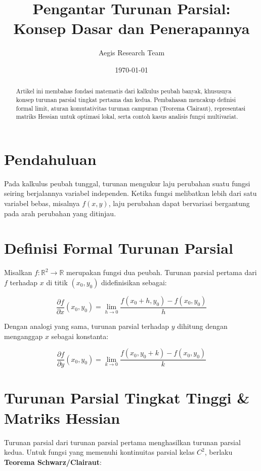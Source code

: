 \documentclass[11pt,a4paper]{article}
\title{\textbf{Pengantar Turunan Parsial: Konsep Dasar dan Penerapannya}}
\author{Aegis Research Team}
\date{\today}
\begin{document}
\maketitle

\begin{abstract}
Artikel ini membahas fondasi matematis dari kalkulus peubah banyak, khususnya konsep turunan parsial tingkat pertama dan kedua. Pembahasan mencakup definisi formal limit, aturan komutativitas turunan campuran (Teorema Clairaut), representasi matriks Hessian untuk optimasi lokal, serta contoh kasus analisis fungsi multivariat. \cite{engel2007}
\end{abstract}

\section{Pendahuluan}
Pada kalkulus peubah tunggal, turunan mengukur laju perubahan suatu fungsi seiring berjalannya variabel independen. Ketika fungsi melibatkan lebih dari satu variabel bebas, misalnya $f(x, y)$, laju perubahan dapat bervariasi bergantung pada arah perubahan yang ditinjau.

\section{Definisi Formal Turunan Parsial}
Misalkan $f: \mathbb{R}^2 \to \mathbb{R}$ merupakan fungsi dua peubah. Turunan parsial pertama dari $f$ terhadap $x$ di titik $(x_0, y_0)$ didefinisikan sebagai:

\begin{equation}
    \frac{\partial f}{\partial x}(x_0, y_0) = \lim_{h \to 0} \frac{f(x_0 + h, y_0) - f(x_0, y_0)}{h}
\end{equation}

Dengan analogi yang sama, turunan parsial terhadap $y$ dihitung dengan menganggap $x$ sebagai konstanta:

\begin{equation}
    \frac{\partial f}{\partial y}(x_0, y_0) = \lim_{k \to 0} \frac{f(x_0, y_0 + k) - f(x_0, y_0)}{k}
\end{equation}

\section{Turunan Parsial Tingkat Tinggi \& Matriks Hessian}
Turunan parsial dari turunan parsial pertama menghasilkan turunan parsial kedua. Untuk fungsi yang memenuhi kontinuitas parsial kelas $C^2$, berlaku \textbf{Teorema Schwarz/Clairaut}:
\end{document}
